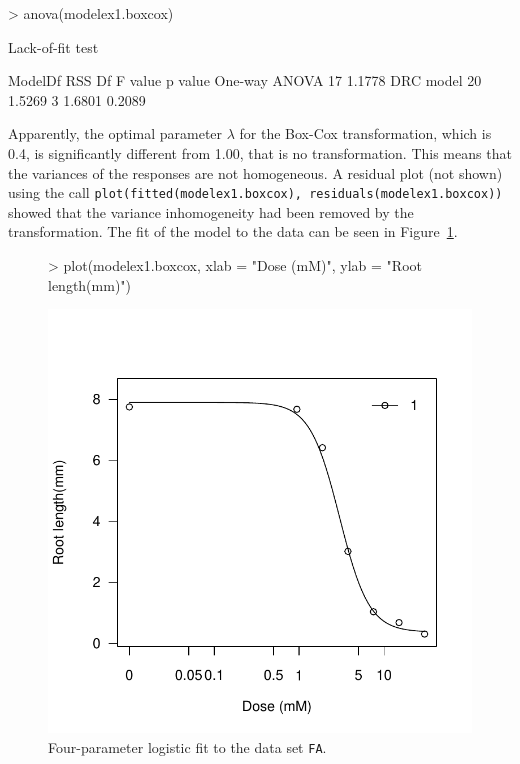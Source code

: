 \documentclass[a4paper]{article}
\begin{document}
\begin{Schunk}
\begin{Sinput}
> anova(modelex1.boxcox)
\end{Sinput}
\begin{Soutput}
Lack-of-fit test

              ModelDf    RSS Df F value p value
One-way ANOVA      17 1.1778                   
DRC model          20 1.5269  3  1.6801  0.2089
\end{Soutput}
\end{Schunk}

Apparently, the optimal parameter $\lambda$ for the Box-Cox transformation, which is 0.4, is significantly different from 1.00, that is no transformation.
This means that the variances of the responses are not homogeneous. A residual plot (not shown)
using the call \verb+plot(fitted(modelex1.boxcox), residuals(modelex1.boxcox))+ showed that the variance inhomogeneity had been removed by the
transformation.  The fit of the model to the data can be seen in Figure~\ref{fig-onefit:boxcox}.

\begin{figure}[!htbp]
\begin{center}

\begin{Schunk}
\begin{Sinput}
> plot(modelex1.boxcox, xlab = "Dose (mM)", ylab = "Root length(mm)")
\end{Sinput}
\end{Schunk}
\includegraphics{drc-sec4-plot1}
\caption{Four-parameter logistic fit to the data set \texttt{FA}.} \label{fig-onefit:boxcox}
\end{center}
\end{figure}
\end{document}
